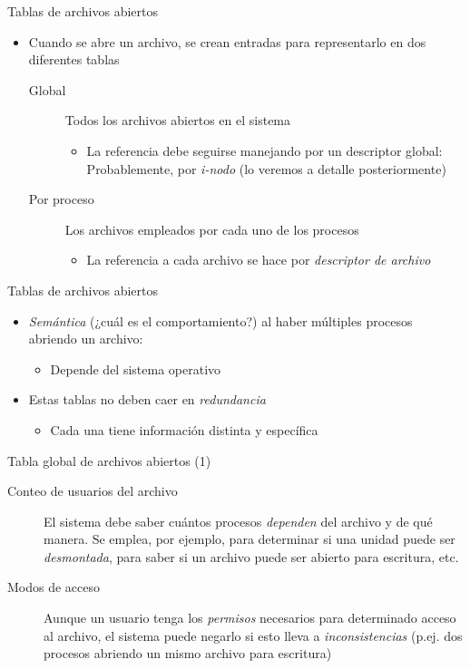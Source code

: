 \documentclass[presentation]{beamer}
\begin{document}
\begin{frame}[label={sec:org6e558f9}]{Tablas de archivos abiertos}
\begin{itemize}
\item Cuando se abre un archivo, se crean entradas para representarlo en
dos diferentes tablas
\begin{description}
\item[{Global}] Todos los archivos abiertos en el sistema
\begin{itemize}
\item La referencia debe seguirse manejando por un descriptor global:
Probablemente, por \emph{i-nodo} (lo veremos a detalle
posteriormente)
\end{itemize}
\item[{Por proceso}] Los archivos empleados por cada uno de los procesos
\begin{itemize}
\item La referencia a cada archivo se hace por \emph{descriptor de
archivo}
\end{itemize}
\end{description}
\end{itemize}
\end{frame}

\begin{frame}[label={sec:org00ba690}]{Tablas de archivos abiertos}
\begin{itemize}
\item \emph{Semántica} (¿cuál es el comportamiento?) al haber múltiples
procesos abriendo un archivo:
\begin{itemize}
\item Depende del sistema operativo
\end{itemize}
\item Estas tablas no deben caer en \emph{redundancia}
\begin{itemize}
\item Cada una tiene información distinta y específica
\end{itemize}
\end{itemize}
\end{frame}

\begin{frame}[label={sec:org709b344}]{Tabla global de archivos abiertos (1)}
\begin{description}
\item[{Conteo de usuarios del archivo}] El sistema debe saber cuántos
procesos \emph{dependen} del archivo y de qué manera. Se emplea, por
ejemplo, para determinar si una unidad puede ser \emph{desmontada},
para saber si un archivo puede ser abierto para escritura, etc.
\item[{Modos de acceso}] Aunque un usuario tenga los \emph{permisos}
necesarios para determinado acceso al archivo, el sistema puede
negarlo si esto lleva a \emph{inconsistencias} (p.ej. dos procesos
abriendo un mismo archivo para escritura)
\end{description}
\end{frame}
\end{document}
